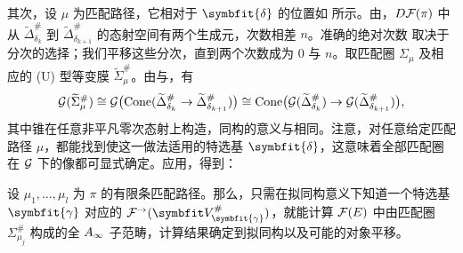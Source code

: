 其次，设 $\mu$ 为匹配路径，它相对于 $\symbfit{\delta}$ 的位置如 所示。由，$D\mathcal F(\pi)$ 中从 $\widetilde\Delta_{\delta_k}^\#$ 到 $\widetilde\Delta_{\delta_{k+1}}^\#$ 的态射空间有两个生成元，次数相差 $n$。准确的绝对次数
取决于分次的选择；我们平移这些分次，直到两个次数成为 $0$ 与 $n$。取匹配圈 $\Sigma_\mu$ 及相应的 (U) 型等变膜 $\widetilde\Sigma_\mu^\#$。由与，有
\[
\mathcal G(\widetilde\Sigma_\mu^\#)
\cong\mathcal G\bigl(\operatorname{Cone}(\widetilde\Delta_{\delta_k}^\#\to\widetilde\Delta_{\delta_{k+1}}^\#)\bigr)
\cong\operatorname{Cone}\bigl(\mathcal G(\widetilde\Delta_{\delta_k}^\#)\to\mathcal G(\widetilde\Delta_{\delta_{k+1}}^\#)\bigr),
\]
其中锥在任意非平凡零次态射上构造，同构的意义与相同。注意，对任意给定匹配路径 $\mu$，都能找到使这一做法适用的特选基 $\symbfit{\delta}$，这意味着全部匹配圈在 $\mathcal G$ 下的像都可显式确定。应用，得到：

\begin{corollary}\label{st:18.26}
设 $\mu_1,\ldots,\mu_l$ 为 $\pi$ 的有限条匹配路径。那么，只需在拟同构意义下知道一个特选基 $\symbfit{\gamma}$ 对应的 $\F^\to(\symbfit V_{\symbfit{\gamma}}^\#)$，就能计算 $\mathcal F(E)$ 中由匹配圈 $\Sigma_{\mu_j}^\#$ 构成的全 $A_\infty$ 子范畴，计算结果确定到拟同构以及可能的对象平移。
\end{corollary}
